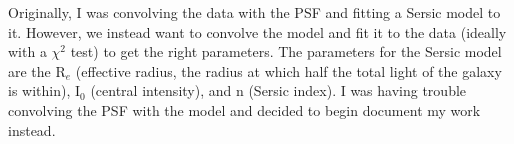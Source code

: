 \documentclass[10pt,letterpaper]{article}
\begin{document}
\newpage

Originally, I was convolving the data with the PSF and fitting a Sersic model to it. However, we instead want to convolve the model and fit it to the data (ideally with a $\chi^2$ test) to get the right parameters. The parameters for the Sersic model are the R$_e$ (effective radius, the radius at which half the total light of the galaxy is within), I$_0$ (central intensity), and n (Sersic index). I was having trouble convolving the PSF with the model and decided to begin document my work instead.\\


\newpage
\end{document}
